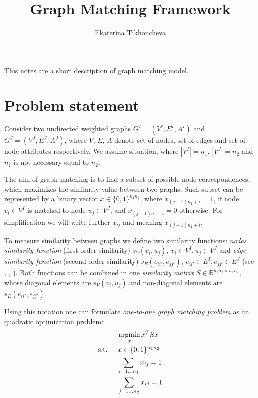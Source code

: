 \documentclass[
	fontsize=12pt,
	paper=a4,
	twoside=false,
	numbers=noenddot,
	plainheadsepline,
	toc=listof,
	toc=bibliography
]{scrartcl}
\begin{document}
\pagestyle{plain}

\title{Graph Matching Framework}
\author{Ekaterina Tikhoncheva}
\date{} 

\maketitle 

This notes are a short description of graph matching model.

\tableofcontents
\newpage

\section{Problem statement}
Consider two undirected weighted graphs $G^I = (V^I, E^I, A^I)$ and $G^J = (V^J, E^J, A^J)$, where $V$, $E$, $A$ denote set of nodes,
set of edges and set of node attributes respectively. We assume situation, where $|V^I|=n_1$, $|V^J|=n_2$ and $n_1$ is not necessary equal to $n_2$.

The aim of graph matching is to find a subset of possible node correspondences, which maximizes the similarity value between two graphs. Such subset can be represented by a binary vector $x\in \{0,1\}^{n_1n_2}$, where $x_{(j-1)n_1+i}=1$, if node $v_i\in V^I$ is matched to node $u_j\in V^J$, and $x_{(j-1)n_1+i}=0$ otherwise. For simplification we will write further $x_{ij}$ and meaning $x_{(j-1)n_1+i}$.

To measure similarity between graphs we define two similarity functions: \emph{nodes similarity function} (first-order similarity) $s_V(v_i, u_j),\ v_i\in V^I, u_j\in V^J$ and \emph{edge similarity function} (second-order similarity) $s_E(e_{ii'}, e_{jj'}),\ e_{ii'}\in E^I, e_{jj'}\in E^J$ (see \cite{Cho2014_Haystack}, \cite{Cho2012_ProgressiveGM}, \cite{Cho2010_RRWM}). Both functions can be combined in one \emph{similarity matrix $S\in\mathbb{R}^{n_1n_2\times n_1n_2}$}, whose diagonal elements are $s_V(v_i, u_j)$ and non-diagonal elements are $s_E(e_{ii'}, e_{jj'})$.


Using this notation one can formulate \emph{one-to-one graph matching problem} as an quadratic optimization problem:
\begin{alignat}{2}
    &     && \argmin_x{x^TSx}                           \label{QIP::1}\\
    & \text{s.t. } &&  x\in \{0,1\}^{n_1n_2}            \label{QIP::2}\\
    &             &&  \sum_{i=1\dots n_1} x_{ij} = 1    \label{QIP::3}\\
    &             &&  \sum_{j=1\dots n_2} x_{ij} = 1    \label{QIP::4}
 \end{alignat}
 
\end{document}
